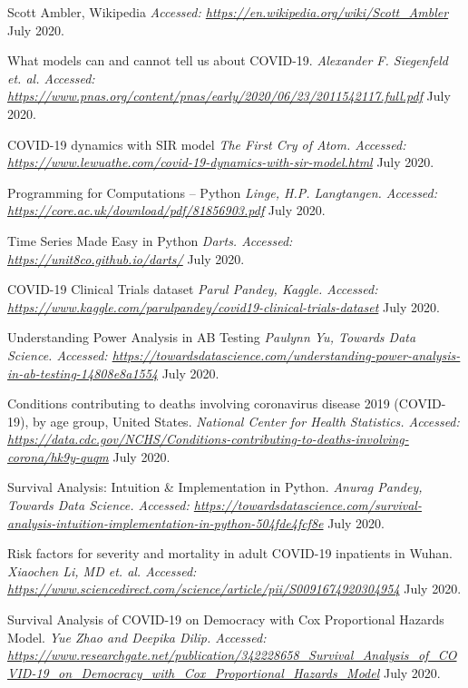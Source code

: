 \begin{thebibliography}{1}
 Scott Ambler, Wikipedia {\em Accessed:  \url{https://en.wikipedia.org/wiki/Scott_Ambler}} July 2020.

 What models can and cannot tell us about COVID-19. {\em Alexander F. Siegenfeld et. al. Accessed:  \url{https://www.pnas.org/content/pnas/early/2020/06/23/2011542117.full.pdf}} July 2020.

 COVID-19 dynamics with SIR model {\em The First Cry of Atom. Accessed:  \url{https://www.lewuathe.com/covid-19-dynamics-with-sir-model.html}} July 2020.

 Programming for Computations – Python {\em Linge, H.P. Langtangen. Accessed:  \url{https://core.ac.uk/download/pdf/81856903.pdf}} July 2020.

 Time Series Made Easy in Python {\em Darts. Accessed:  \url{https://unit8co.github.io/darts/}} July 2020.

 COVID-19 Clinical Trials dataset {\em Parul Pandey, Kaggle.
Accessed:  \url{https://www.kaggle.com/parulpandey/covid19-clinical-trials-dataset}} July 2020.

 Understanding Power Analysis in AB Testing {\em Paulynn Yu, Towards Data Science.
Accessed:  \url{https://towardsdatascience.com/understanding-power-analysis-in-ab-testing-14808e8a1554}} July 2020.

 Conditions contributing to deaths involving coronavirus disease 2019 (COVID-19), by age group, United States. {\em 	National Center for Health Statistics. Accessed:  \url{https://data.cdc.gov/NCHS/Conditions-contributing-to-deaths-involving-corona/hk9y-quqm}} July 2020.

 Survival Analysis: Intuition & Implementation in Python. {\em 	Anurag Pandey, Towards Data Science. Accessed:  \url{https://towardsdatascience.com/survival-analysis-intuition-implementation-in-python-504fde4fcf8e}} July 2020.

 Risk factors for severity and mortality in adult COVID-19 inpatients in Wuhan. {\em Xiaochen Li, MD et. al. Accessed:  \url{https://www.sciencedirect.com/science/article/pii/S0091674920304954}} July 2020.

 Survival Analysis of COVID-19 on Democracy with Cox Proportional Hazards Model. {\em 	Yue Zhao and Deepika Dilip. Accessed:  \url{https://www.researchgate.net/publication/342228658_Survival_Analysis_of_COVID-19_on_Democracy_with_Cox_Proportional_Hazards_Model}} July 2020.


\end{thebibliography}
